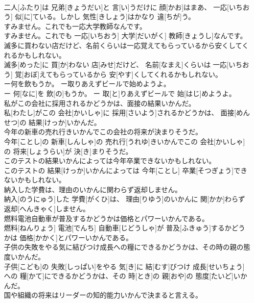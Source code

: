 \documentclass[8pt]{extreport}
\begin{document}
\begin{CJK}{UTF8}{min}
\\	二人[ふたり]は 兄弟[きょうだい]と 言[い]うだけに 顔[かお]はまあ、 一応[いちおう] 似[に]ている。しかし 気性[きしょう]はかなり 違[ちが]う。
\\	すみません。これでも一応大学教師なんです。	
\\	すみません。これでも 一応[いちおう] 大学[だいがく] 教師[きょうし]なんです。
\\	滅多に買わない店だけど、名前くらいは一応覚えてもらっているから安くしてくれるかもしれない。	
\\	滅多[めった]に 買[か]わない 店[みせ]だけど、 名前[なまえ]くらいは 一応[いちおう] 覚[おぼ]えてもらっているから 安[やす]くしてくれるかもしれない。
\\	ー何を飲もうか。 ー取りあえずビールで始めようよ。	
\\	ー 何[なに]を 飲[の]もうか。 ー 取[と]りあえずビールで 始[はじ]めようよ。
\\	私がこの会社に採用されるかどうかは、面接の結果いかんだ。	
\\	私[わたし]がこの 会社[かいしゃ]に 採用[さいよう]されるかどうかは、 面接[めんせつ]の 結果[けっか]いかんだ。
\\	今年の新車の売れ行きいかんでこの会社の将来が決まりそうだ。	
\\	今年[ことし]の 新車[しんしゃ]の 売れ行[うれゆ]きいかんでこの 会社[かいしゃ]の 将来[しょうらい]が 決[き]まりそうだ。
\\	このテストの結果いかんによっては今年卒業できないかもしれない。	
\\	このテストの 結果[けっか]いかんによっては 今年[ことし] 卒業[そつぎょう]できないかもしれない。
\\	納入した学費は、理由のいかんに関わらず返却しません。	
\\	納入[のうにゅう]した 学費[がくひ]は、 理由[りゆう]のいかんに 関[かか]わらず 返却[へんきゃく]しません。
\\	燃料電池自動車が普及するかどうかは価格とパワーいかんである。	
\\	燃料[ねんりょう] 電池[でんち] 自動車[じどうしゃ]が 普及[ふきゅう]するかどうかは 価格[かかく]とパワーいかんである。
\\	子供の失敗をやる気に結びつけ成長への糧にできるかどうかは、その時の親の態度いかんだ。	
\\	子供[こども]の 失敗[しっぱい]をやる 気[き]に 結[むす]びつけ 成長[せいちょう]への 糧[かて]にできるかどうかは、その 時[とき]の 親[おや]の 態度[たいど]いかんだ。
\\	国や組織の将来はリーダーの知的能力いかんで決まると言える。	

\end{CJK}
\end{document}
